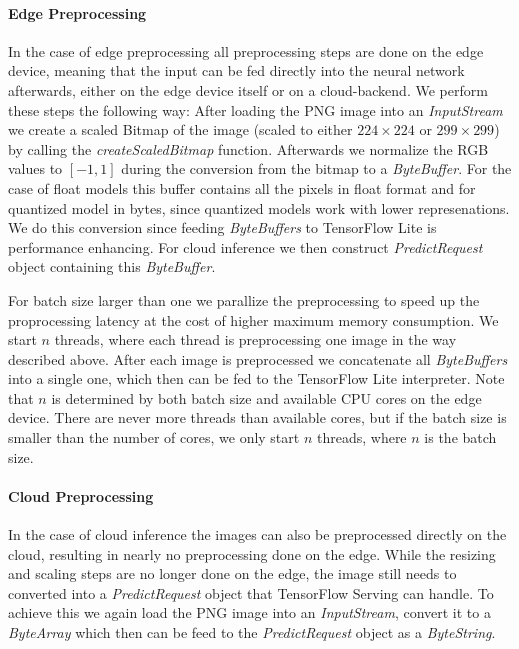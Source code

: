 \paragraph{Edge Preprocessing}
\label{chap:preproImpl}
In the case of edge preprocessing all preprocessing steps are done on the edge device, meaning that the input can be fed directly into the neural network afterwards, either on the edge device itself or on a cloud-backend.
We perform these steps the following way: After loading the PNG image into an \emph{InputStream} we create a scaled Bitmap of the image (scaled to either $224\times224$ or $299\times299$) by calling the \emph{createScaledBitmap} function. 
Afterwards we normalize the RGB values to $[-1,1]$ during the conversion from the bitmap to a \emph{ByteBuffer}. 
For the case of float models this buffer contains all the pixels in float format and for quantized model in bytes, since quantized models work with lower represenations.
We do this conversion since feeding \emph{ByteBuffers} to TensorFlow Lite is performance enhancing. %
For cloud inference we then construct \emph{PredictRequest} object containing this \emph{ByteBuffer}.

For batch size larger than one we parallize the preprocessing to speed up the proprocessing latency at the cost of higher maximum memory consumption. We start $n$ threads, where each thread is preprocessing one image in the way described above. After each image is preprocessed we concatenate all \emph{ByteBuffers} into a single one, which then can be fed to the TensorFlow Lite interpreter. Note that $n$ is determined by both batch size and available CPU cores on the edge device. There are never more threads than available cores, but if the batch size is smaller than the number of cores, we only start $n$ threads, where $n$ is the batch size. 

\paragraph{Cloud Preprocessing}

In the case of cloud inference the images can also be preprocessed directly on the cloud, resulting in nearly no preprocessing done on the edge. While the resizing and scaling steps are no longer done on the edge, the image still needs to converted into a \emph{PredictRequest} object that TensorFlow Serving can handle.
To achieve this we again load the PNG image into an \emph{InputStream}, convert it to a \emph{ByteArray} which then can be feed to the \emph{PredictRequest} object as a \emph{ByteString}. 


